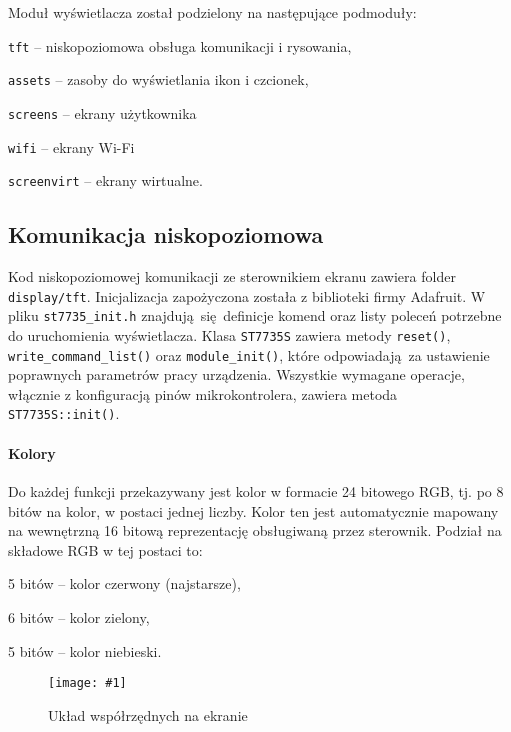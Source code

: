 \documentclass[12pt]{report}
\let\tempone\itemize
\let\temptwo\enditemize
\renewenvironment{itemize}{\tempone\setlength{\itemsep}{0cm}}{\temptwo}
\newcommand{\imgint}[4]{
	\begin{figure}[{#4}]
		\centering
		\texttt{[image: \#1]}
		\caption{#2}
		\label{#1}
	\end{figure}
}
\newcommand{\imgh}[3]{\imgint{#1}{#2}{#3}{H}}
\begin{document}
		\noindent
		Moduł wyświetlacza został podzielony na następujące podmoduły:
		\begin{itemize}
			\item \lstinline|tft| -- niskopoziomowa obsługa komunikacji i rysowania,
			\item \lstinline|assets| -- zasoby do wyświetlania ikon i czcionek,
			\item \lstinline|screens| -- ekrany użytkownika
			\begin{itemize}
				\item \lstinline|wifi| -- ekrany Wi-Fi
			\end{itemize}
			\item \lstinline|screenvirt| -- ekrany wirtualne.
		\end{itemize}
		
		\subsection{Komunikacja niskopoziomowa}
			Kod niskopoziomowej komunikacji ze sterownikiem ekranu zawiera folder \lstinline|display/tft|. Inicjalizacja zapożyczona została z biblioteki firmy Adafruit. W pliku \lstinline|st7735_init.h| znajdują się definicje komend oraz listy poleceń potrzebne do uruchomienia wyświetlacza. Klasa \lstinline|ST7735S| zawiera metody \lstinline|reset()|, \lstinline|write_command_list()| oraz \lstinline|module_init()|, które odpowiadają za ustawienie poprawnych parametrów pracy urządzenia. Wszystkie wymagane operacje, włącznie z konfiguracją pinów mikrokontrolera, zawiera metoda \lstinline|ST7735S::init()|.
			
		\paragraph{Kolory}
			Do każdej funkcji przekazywany jest kolor w formacie 24 bitowego RGB, tj. po 8 bitów na kolor, w postaci jednej liczby. Kolor ten jest automatycznie mapowany na wewnętrzną 16 bitową reprezentację obsługiwaną przez sterownik. Podział na składowe RGB w tej postaci to:
			\begin{itemize}
				\item 5 bitów -- kolor czerwony (najstarsze),
				\item 6 bitów -- kolor zielony,
				\item 5 bitów -- kolor niebieski.
			\end{itemize}
		
		\imgh{3/PicoRadio-screen-xy}{Układ współrzędnych na ekranie}{0.45}
\end{document}
